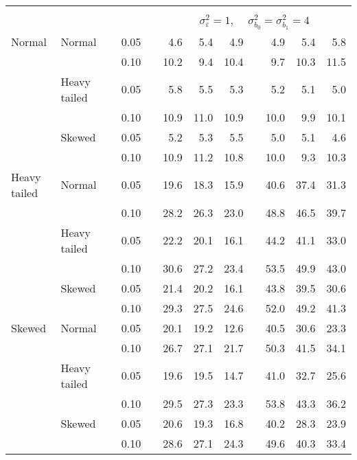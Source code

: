 \begin{table}[ht]
\begin{scriptsize}
\begin{center}
\begin{tabular}{ll p{.1cm} c p{.1cm} rrr p{.1cm} rrr}
&&&&&&&&&&&\\
& && && \multicolumn{7}{c}{$\sigma_{\varepsilon}^2 = 1$, \ \ $\sigma_{b_0}^2 = \sigma_{b_1}^2 = 4$} \\ \cline{6-12}
Normal       & Normal       && 0.05 &&   4.6 & 5.4 & 4.9 &   & 4.9 & 5.4 & 5.8 \\ 
             &              && 0.10 &&   10.2 & 9.4 & 10.4 &   & 9.7 & 10.3 & 11.5 \\ 
             & Heavy tailed && 0.05 &&   5.8 & 5.5 & 5.3 &   & 5.2 & 5.1 & 5.0 \\ 
             &              && 0.10 &&   10.9 & 11.0 & 10.9 &   & 10.0 & 9.9 & 10.1 \\ 
             & Skewed       && 0.05 &&   5.2 & 5.3 & 5.5 &   & 5.0 & 5.1 & 4.6 \\ 
             &              && 0.10 &&   10.9 & 11.2 & 10.8 &   & 10.0 & 9.3 & 10.3 \\ 
Heavy tailed & Normal       && 0.05 &&   19.6 & 18.3 & 15.9 &   & 40.6 & 37.4 & 31.3 \\ 
             &              && 0.10 &&   28.2 & 26.3 & 23.0 &   & 48.8 & 46.5 & 39.7 \\ 
             & Heavy tailed && 0.05 &&   22.2 & 20.1 & 16.1 &   & 44.2 & 41.1 & 33.0 \\ 
             &              && 0.10 &&   30.6 & 27.2 & 23.4 &   & 53.5 & 49.9 & 43.0 \\ 
             & Skewed       && 0.05 &&   21.4 & 20.2 & 16.1 &   & 43.8 & 39.5 & 30.6 \\ 
             &              && 0.10 &&   29.3 & 27.5 & 24.6 &   & 52.0 & 49.2 & 41.3 \\ 
Skewed       & Normal       && 0.05 &&   20.1 & 19.2 & 12.6 &   & 40.5 & 30.6 & 23.3 \\ 
             &              && 0.10 &&   26.7 & 27.1 & 21.7 &   & 50.3 & 41.5 & 34.1 \\ 
             & Heavy tailed && 0.05 &&   19.6 & 19.5 & 14.7 &   & 41.0 & 32.7 & 25.6 \\ 
             &              && 0.10 &&   29.5 & 27.3 & 23.3 &   & 53.8 & 43.3 & 36.2 \\ 
             & Skewed       && 0.05 &&   20.6 & 19.3 & 16.8 &   & 40.2 & 28.3 & 23.9 \\ 
             &              && 0.10 &&   28.6 & 27.1 & 24.3 &   & 49.6 & 40.3 & 33.4 \\ 

\hline
\end{tabular}
\end{center}
\end{scriptsize}
\end{table}

